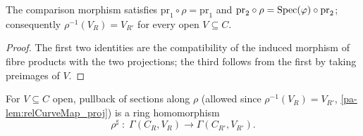 \begin{lemma}
  \label{pa-lem:relCurveMap_proj}
  \leanok

  The comparison morphism satisfies
  \(\mathrm{pr}_1 \circ \rho = \mathrm{pr}_1\) and
  \(\mathrm{pr}_2 \circ \rho = \operatorname{Spec}(\varphi) \circ \mathrm{pr}_2\); consequently
  \(\rho^{-1}(V_R) = V_{R'}\) for every open \(V \subseteq C\).
\end{lemma}
\begin{proof}
  \leanok
  The first two identities are the compatibility of the induced morphism of fibre
  products with the two projections; the third follows from the first by taking
  preimages of \(V\).
\end{proof}

\begin{definition}
  \label{pa-def:relSectionsMap}
  \leanok

  For \(V \subseteq C\) open, pullback of sections along \(\rho\) (allowed since
  \(\rho^{-1}(V_R) = V_{R'}\), \ref{pa-lem:relCurveMap_proj}) is a ring homomorphism
  \[
    \rho^{\sharp} \;:\; \Gamma(C_R, V_R) \longrightarrow \Gamma(C_{R'}, V_{R'}) .
  \]
\end{definition}

